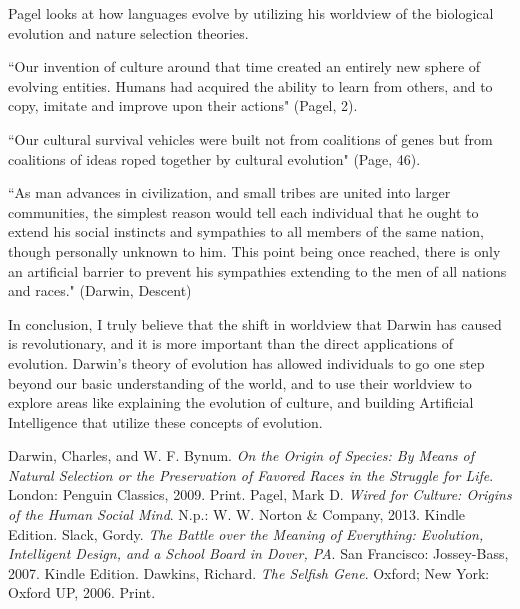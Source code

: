 \documentclass[11pt, oneside]{article}
\begin{document}
\par Pagel looks at how languages evolve by utilizing his worldview of the biological evolution and nature selection theories. 

``Our invention of culture around that time created an entirely new sphere of evolving entities. Humans had acquired the ability to learn from others, and to copy, imitate and improve upon their actions" (Pagel, 2).

``Our cultural survival vehicles were built not from coalitions of genes but from coalitions of ideas roped together by cultural evolution" (Page, 46).

``As man advances in civilization, and small tribes are united into larger communities, the simplest reason would tell each individual that he ought to extend his social instincts and sympathies to all members of the same nation, though personally unknown to him. This point being once reached, there is only an artificial barrier to prevent his sympathies extending to the men of all nations and races." (Darwin, Descent)


\par In conclusion, I truly believe that the shift in worldview that Darwin has caused is revolutionary, and it is more important than the direct applications of evolution. Darwin's theory of evolution has allowed individuals to go one step beyond our basic understanding of the world, and to use their worldview to explore areas like explaining the evolution of culture, and building Artificial Intelligence that utilize these concepts of evolution. 


\begin{thebibliography}{9}
	Darwin, Charles, and W. F. Bynum.
	\emph{On the Origin of Species: By Means of Natural Selection or the Preservation of Favored Races in the Struggle for Life}.
	London: Penguin Classics, 2009.
	Print.
	Pagel, Mark D. 
	\emph{Wired for Culture: Origins of the Human Social Mind}. 
	N.p.: W. W. Norton \& Company, 2013. 
	Kindle Edition. 
	Slack, Gordy. 
	\emph{The Battle over the Meaning of Everything: Evolution, Intelligent Design, and a School Board in Dover, PA}.
	San Francisco: Jossey-Bass, 2007. 
	Kindle Edition.
	Dawkins, Richard. 
	\emph{The Selfish Gene}.
	Oxford; New York: Oxford UP, 2006. 
	Print.
\end{thebibliography}
\end{document}
